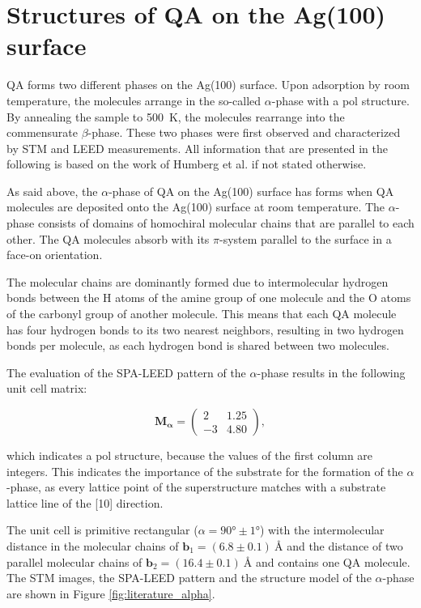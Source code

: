\section{Structures of QA on the Ag(100) surface}

\Ac{QA} forms two different phases on the Ag(100) surface. Upon adsorption by room temperature, the molecules arrange in the so-called $\alpha$-phase with a \ac{pol} structure. By annealing the sample to 500~\si{K}, the molecules rearrange into the commensurate $\beta$-phase. These two phases were first observed and characterized by \ac{STM} and \ac{LEED} measurements. All information that are presented in the following is based on the work of Humberg et al. \autocite{Humberg2020, Humberg2025} if not stated otherwise.

As said above, the $\alpha$-phase of \ac{QA} on the Ag(100) surface has forms when \ac{QA} molecules are deposited onto the Ag(100) surface at room temperature. The $\alpha$-phase consists of domains of homochiral molecular chains that are parallel to each other. The \ac{QA} molecules absorb with its $\pi$-system parallel to the surface in a face-on orientation.

The molecular chains are dominantly formed due to intermolecular hydrogen bonds between the H atoms of the amine group of one molecule and the O atoms of the carbonyl group of another molecule. This means that each \ac{QA} molecule has four hydrogen bonds to its two nearest neighbors, resulting in two hydrogen bonds per molecule, as each hydrogen bond is shared between two molecules. 

The evaluation of the \ac{SPA-LEED} pattern of the $\alpha$-phase results in the following unit cell matrix:

\begin{equation*}
\mathbf{M_\alpha} =\begin{pmatrix}
2 & 1.25 \\
-3 & 4.80 
\end{pmatrix},
\end{equation*}

which indicates a \ac{pol} structure, because the values of the first column are integers.\autocite{Hooks2001} This indicates the importance of the substrate for the formation of the $\alpha$-phase, as every lattice point of the superstructure matches with a substrate lattice line of the [10] direction.

The unit cell is primitive rectangular ($\alpha=90° \pm 1°$) with the intermolecular distance in the molecular chains of $\mathbf{b}_1=(6.8\pm0.1)~\si{\angstrom}$ and the distance of two parallel molecular chains of $\mathbf{b}_2=(16.4\pm0.1)~\si{\angstrom}$ and contains one \ac{QA} molecule. The \ac{STM} images, the \ac{SPA-LEED} pattern and the structure model of the $\alpha$-phase are shown in Figure \ref{fig:literature_alpha}.

